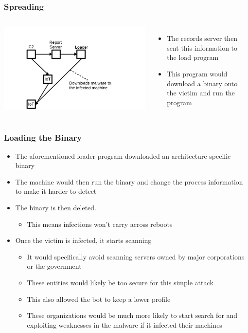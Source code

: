 \documentclass{beamer}
\begin{document}
\begin{frame}
	\frametitle{Spreading}
	\begin{columns}
			\includegraphics[width=\textwidth]{fig3.jpg}
			\begin{itemize}
				\item<+-> The records server then sent this information to the load program
				\item<+-> This program would download a binary onto the victim and run the program
			\end{itemize}
	\end{columns}
\end{frame}

\begin{frame}
	\frametitle{Loading the Binary}
	\begin{itemize}
		\item<+-> The aforementioned loader program downloaded an architecture specific binary
		\item<+-> The machine would then run the binary and change the process information to make it harder to detect
		\item<+-> The binary is then deleted.
		\begin{itemize}
			\item<+-> This means infections won't carry across reboots
		\end{itemize}
		\item<+-> Once the victim is infected, it starts scanning
		\begin{itemize}
			\item<+-> It would specifically avoid scanning servers owned by major corporations or the government
			\item<+-> These entities would likely be too secure for this simple attack
			\item<+-> This also allowed the bot to keep a lower profile
			\item<+-> These organizations would be much more likely to start search for and exploiting weaknesses in the malware if it infected their machines
		\end{itemize}
	\end{itemize}
\end{frame}
\end{document}
